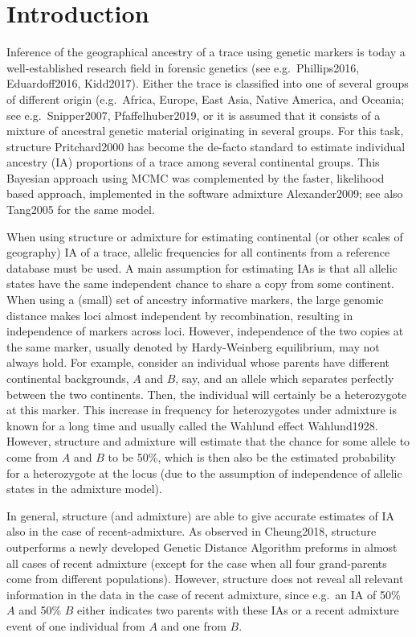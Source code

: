 \documentclass[12pt]{article}
\theoremstyle{definition}
\begin{document}
\section{Introduction}
Inference of the geographical ancestry of a trace using genetic
markers is today a well-established research field in forensic
genetics (see e.g.\ \cite{article}{Phillips2016, Eduardoff2016,
  Kidd2017}). Either the trace is classified into one of several
groups of different origin (e.g.\ Africa, Europe, East Asia, Native
America, and Oceania; see e.g.\ \cite{article}{Snipper2007,
  Pfaffelhuber2019}, or it is assumed that it consists of a mixture of
ancestral genetic material originating in several groups. For this
task, {\sc structure} \cite{article}{Pritchard2000} has become the
de-facto standard to estimate individual ancestry (IA) proportions of
a trace among several continental groups. This Bayesian approach using
MCMC was complemented by the faster, likelihood based approach,
implemented in the software {\sc admixture}
\cite{article}{Alexander2009}; see also \cite{article}{Tang2005} for
the same model.

When using {\sc structure} or {\sc admixture} for estimating
continental (or other scales of geography) IA of a trace, allelic
frequencies for all continents from a reference database must be
used. A main assumption for estimating IAs is that all allelic states
have the same independent chance to share a copy from some continent.
When using a (small) set of ancestry informative markers, the large
genomic distance makes loci almost independent by recombination,
resulting in independence of markers across loci. However,
independence of the two copies at the same marker, usually denoted by
Hardy-Weinberg equilibrium, may not always hold. For example, consider
an individual whose parents have different continental backgrounds,
$A$ and $B$, say, and an allele which separates perfectly between the
two continents. Then, the individual will certainly be a heterozygote
at this marker. This increase in frequency for heterozygotes under
admixture is known for a long time and usually called the Wahlund
effect \cite{article}{Wahlund1928}.  However, {\sc structure} and {\sc
  admixture} will estimate that the chance for some allele to come
from $A$ and $B$ to be 50\%, which is then also be the estimated
probability for a heterozygote at the locus (due to the assumption of
independence of allelic states in the admixture model).

In general, {\sc structure} (and {\sc admixture}) are able to give
accurate estimates of IA also in the case of recent-admixture. As
observed in \cite{article}{Cheung2018}, {\sc structure} outperforms a
newly developed Genetic Distance Algorithm preforms in almost all
cases of recent admixture (except for the case when all four
grand-parents come from different populations). However, {\sc
  structure} does not reveal all relevant information in the data in
the case of recent admixture, since e.g.\ an IA of 50\% $A$ and 50\%
$B$ either indicates two parents with these IAs or a recent admixture
event of one individual from $A$ and one from $B$.
\end{document}
